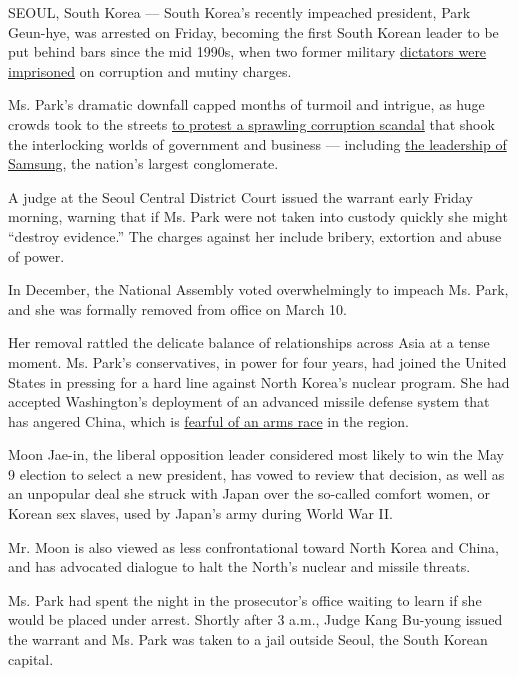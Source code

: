 SEOUL, South Korea --- South Korea's recently impeached president, Park
Geun-hye, was arrested on Friday, becoming the first South Korean leader
to be put behind bars since the mid 1990s, when two former military
\href{http://www.nytimes3xbfgragh.onion/1995/12/22/world/south-korea-indicts-2-former-presidents-in-staging-of-1979-coup.html}{dictators
were imprisoned} on corruption and mutiny charges.

Ms. Park's dramatic downfall capped months of turmoil and intrigue, as
huge crowds took to the streets
\href{https://www.nytimes3xbfgragh.onion/2016/11/26/world/asia/korea-park-geun-hye-protests.html}{to
protest a sprawling corruption scandal} that shook the interlocking
worlds of government and business --- including
\href{https://www.nytimes3xbfgragh.onion/2017/03/09/business/jay-y-lee-samsung-trial.html}{the
leadership of Samsung}, the nation's largest conglomerate.

A judge at the Seoul Central District Court issued the warrant early
Friday morning, warning that if Ms. Park were not taken into custody
quickly she might ``destroy evidence.'' The charges against her include
bribery, extortion and abuse of power.

In December, the National Assembly voted overwhelmingly to impeach Ms.
Park, and she was formally removed from office on March 10.

Her removal rattled the delicate balance of relationships across Asia at
a tense moment. Ms. Park's conservatives, in power for four years, had
joined the United States in pressing for a hard line against North
Korea's nuclear program. She had accepted Washington's deployment of an
advanced missile defense system that has angered China, which is
\href{https://www.nytimes3xbfgragh.onion/2017/03/07/world/asia/thaad-missile-defense-us-south-korea-china.html}{fearful
of an arms race} in the region.

Moon Jae-in, the liberal opposition leader considered most likely to win
the May 9 election to select a new president, has vowed to review that
decision, as well as an unpopular deal she struck with Japan over the
so-called comfort women, or Korean sex slaves, used by Japan's army
during World War II.

Mr. Moon is also viewed as less confrontational toward North Korea and
China, and has advocated dialogue to halt the North's nuclear and
missile threats.

Ms. Park had spent the night in the prosecutor's office waiting to learn
if she would be placed under arrest. Shortly after 3 a.m., Judge Kang
Bu-young issued the warrant and Ms. Park was taken to a jail outside
Seoul, the South Korean capital.


